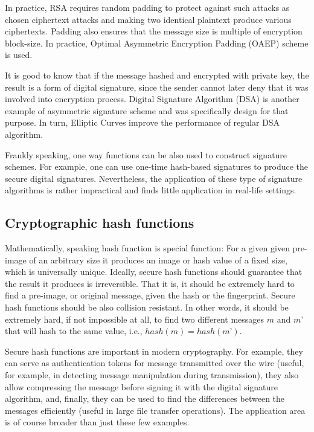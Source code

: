 In practice, RSA requires random padding to protect against such attacks as chosen ciphertext 
attacks and making two identical plaintext produce various ciphertexts. Padding also ensures that the 
message size is multiple of encryption block-size. In practice, Optimal Asymmetric Encryption Padding (OAEP) 
scheme is used.

It is good to know that if the message hashed and encrypted with private key, the result is a 
form of digital signature, since the sender cannot later deny that it was involved into encryption 
process. Digital Signature Algorithm (DSA) is another example of asymmetric signature scheme and 
was specifically design for that purpose. In turn, Elliptic Curves improve the performance of regular DSA 
algorithm.

Frankly speaking, one way functions can be also used to construct signature schemes. 
For example, one can use one-time hash-based signatures to produce the secure digital signatures. Nevertheless, 
the application of these type of signature algorithms is rather impractical and finds 
little application in real-life settings.

\subsection{Cryptographic hash functions}

Mathematically, speaking hash function is special function: For a given given 
pre-image of an arbitrary size it produces an image or hash value of a fixed size, 
which is universally unique. Ideally, secure hash functions should guarantee 
that the result it produces is irreversible. That it is, it 
should be extremely hard to find a pre-image, or original message, given the 
hash or the fingerprint. Secure hash functions should be also collision resistant. 
In other words, it should be extremely hard, if not impossible at all, to 
find two different messages $m$ and $m’$ that will hash to the same value, i.e., 
$hash(m)=hash(m’)$.

Secure hash functions are important in modern cryptography. 
For example, they can serve as authentication tokens for message transmitted over the 
wire (useful, for example, in detecting message manipulation during transmission), 
they also allow compressing the message before signing it with the digital signature 
algorithm, and, finally, they can be used to find the differences between the messages 
efficiently (useful in large file transfer operations). The application area is of 
course broader than just these few examples. 

